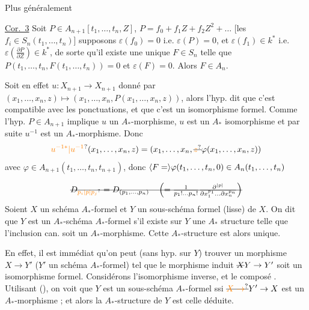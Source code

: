 Plus généralement

\uline{Cor.~3} Soit $P\in A_{n+1}[t_1,\ldots,t_n,Z]$, $P=f_0+f_1Z+f_2Z^2+\ldots$ [les $f_i\in S_n(t_1,\ldots,t_n)$] supposons $\varepsilon(f_0)=0$ i.e. $\varepsilon(P)=0$, et $\varepsilon(f_1)\in k^*$ i.e. $\varepsilon(\frac{\partial P}{\partial Z})\in k^*$, de sorte qu'il existe une unique $F\in S_n$ telle que $P(t_1,\ldots,t_n,F(t_1,\ldots,t_n))=0$ et $\varepsilon(F)=0$. Alors $F\in A_n$.

Soit en effet $u:X_{n+1}\to X_{n+1}$ donné par $(x_1,\ldots,x_n,z)\longmapsto(x_1,\ldots,x_n,P(x_1,\ldots,x_n,z))$, alors l'hyp. dit que c'est compatible avec les ponctuations, et que c'est un isomorphisme formel. Comme l'hyp. $P\in A_{n+1}$ implique $u$ un $A_*$-morphisme, $u$ est un $A_*$ isomorphisme et par suite $u^{-1}$ est un $A_*$-morphisme. Donc
\[
\unsure{u^{-1*}|u^{-1}}(x_1,\ldots,x_n,z)=(x_1,\ldots,x_n,\deleted{\unsure{z}}\varphi(x_1,\ldots,x_n,z))
\]
avec $\varphi\in A_{n+1}(t_1,\ldots,t_n,t_{n+1})$, donc $\inserted{F=}\varphi(t_1,\ldots,t_n,0)\in A_n(t_1,\ldots,t_n)$


\[
\deleted{D_{\unsure{p_i|p|p_j}}=D_{(p_1,\ldots,p_n)}\quad\left(=\frac{1}{p_1!\ldots p_n!}\frac{\partial^{|p|}}{\partial x_1^{p_1}\ldots\partial x_n^{p_n}}\right)}
\]
Soient $X$ un schéma $A_*$-formel et $Y$ un sous-schéma formel (lisse) de $X$.  On dit que $Y$ est un  $A_*$-schéma $A_*$-formel s'il existe sur $Y$ une $A_*$ structure telle que l'inclusion can. soit un $A_*$-morphisme. Cette $A_*$-structure est alors unique.

En effet, il est immédiat qu'on peut (sans hyp. sur $Y$) trouver un  morphisme $X\to Y'$ ($Y'$ un schéma $A_*$-formel) tel que le morphisme induit $\deleted{X}Y\to Y'$ soit un isomorphisme formel.  Considérons l'isomorphisme inverse, et le composé
.
Utilisant (), on voit que  $Y$ est un sous-schéma $A_*$-formel ssi $\deleted{\unsure{X\to}}Y'\to X$ est un $A_*$-morphisme ; et alors la $A_*$-structure de $Y$ est celle déduite.

